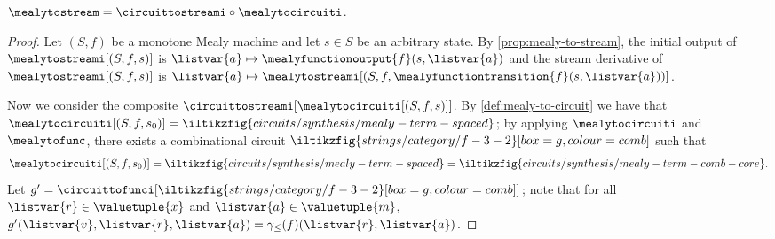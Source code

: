 \documentclass{lmcs}
\begin{document}
\begin{thm}\label{thm:mealy-to-circuit}
    \(
    \mealytostream = \circuittostreami \circ \mealytocircuiti
    \).
\end{thm}
\begin{proof}
    Let \((S ,f)\) be a monotone Mealy machine and let \(s \in S\) be an
    arbitrary state.
    By \autoref{prop:mealy-to-stream}, the initial output of
    \(\mealytostreami[(S, f, s)]\) is
    \(\listvar{a} \mapsto \mealyfunctionoutput{f}\mleft(s, \listvar{a}\mright)\)
    and the stream derivative of \(\mealytostreami[(S, f, s)]\) is \(
    \listvar{a}
    \mapsto
    \mealytostreami[(S, f, \mealyfunctiontransition{f}\mleft(s, \listvar{a}\mright))]
    \).

    Now we consider the composite
    \(\circuittostreami[\mealytocircuiti[(S, f, s)]]\).
    By \autoref{def:mealy-to-circuit} we have that \(
    \mealytocircuiti[(S, f, s_0)]
    =
    \iltikzfig{circuits/synthesis/mealy-term-spaced}
    \); by applying \(\mealytocircuiti\) and \(\mealytofunc\),
    there exists a combinational circuit \(
    \iltikzfig{strings/category/f-3-2}[box=g,colour=comb]
    \) such that \[
        \mealytocircuiti[(S, f, s_0)]
        =
        \iltikzfig{circuits/synthesis/mealy-term-spaced}
        =
        \iltikzfig{circuits/synthesis/mealy-term-comb-core}.
    \]
    Let \(
    g^\prime
    =
    \circuittofunci[\iltikzfig{strings/category/f-3-2}[box=g,colour=comb]]
    \); note that for all \(\listvar{r} \in \valuetuple{x}\) and
    \(\listvar{a} \in \valuetuple{m}\),
    \(g^\prime(\listvar{v}, \listvar{r}, \listvar{a})
    =
    \gamma_\leq(f)(\listvar{r},\listvar{a})
    \).


\end{proof}
\end{document}
